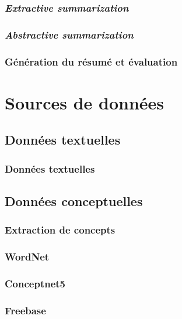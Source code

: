 \documentclass[12pt, handout]{beamer}
\begin{document}
\begin{frame}
 \frametitle{\textit{Extractive summarization}}
 
 
\end{frame}

\begin{frame}
 \frametitle{\textit{Abstractive summarization}}
 
 
\end{frame}


\begin{frame}
 \frametitle{Génération du résumé et évaluation}
 
 
\end{frame}


\section{Sources de données}

\subsection{Données textuelles}

\begin{frame}
 \frametitle{Données textuelles}
 
 
\end{frame}

\subsection{Données conceptuelles}

\begin{frame}
 \frametitle{Extraction de concepts}
 
 
\end{frame}

\begin{frame}
 \frametitle{WordNet}
 
 
\end{frame}

\begin{frame}
 \frametitle{Conceptnet5}
 
 
\end{frame}

\begin{frame}
 \frametitle{Freebase}
 
 
\end{frame}
\end{document}
